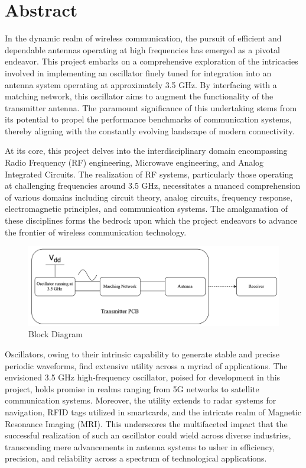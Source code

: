 \section*{Abstract}
In the dynamic realm of wireless communication, the pursuit of efficient and dependable antennas operating at high frequencies has emerged as a pivotal endeavor. This project embarks on a comprehensive exploration of the intricacies involved in implementing an oscillator finely tuned for integration into an antenna system operating at approximately 3.5 GHz. By interfacing with a matching network, this oscillator aims to augment the functionality of the transmitter antenna. The paramount significance of this undertaking stems from its potential to propel the performance benchmarks of communication systems, thereby aligning with the constantly evolving landscape of modern connectivity.\par
At its core, this project delves into the interdisciplinary domain encompassing Radio Frequency (RF) engineering, Microwave engineering, and Analog Integrated Circuits. The realization of RF systems, particularly those operating at challenging frequencies around 3.5 GHz, necessitates a nuanced comprehension of various domains including circuit theory, analog circuits, frequency response, electromagnetic principles, and communication systems. The amalgamation of these disciplines forms the bedrock upon which the project endeavors to advance the frontier of wireless communication technology.\par

\begin{figure}[!h]
    \centering
    \includegraphics[width=0.8\linewidth]{images/misc/block_diagram.png}
    \caption{Block Diagram}
    \label{fig:block-diagram}
\end{figure}

Oscillators, owing to their intrinsic capability to generate stable and precise periodic waveforms, find extensive utility across a myriad of applications. The envisioned 3.5 GHz high-frequency oscillator, poised for development in this project, holds promise in realms ranging from 5G networks to satellite communication systems. Moreover, the utility extends to radar systems for navigation, RFID tags utilized in smartcards, and the intricate realm of Magnetic Resonance Imaging (MRI). This underscores the multifaceted impact that the successful realization of such an oscillator could wield across diverse industries, transcending mere advancements in antenna systems to usher in efficiency, precision, and reliability across a spectrum of technological applications.\par

